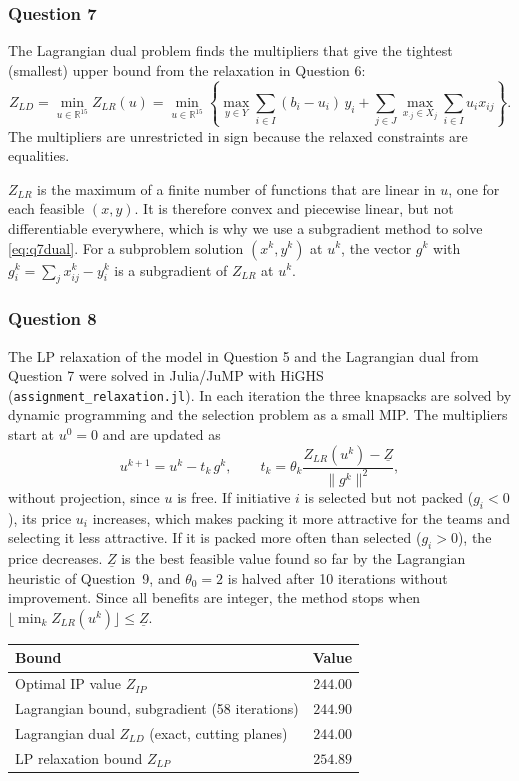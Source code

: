 \subsubsection*{Question 7}

The Lagrangian dual problem finds the multipliers that give the tightest
(smallest) upper bound from the relaxation in Question 6:
\begin{equation}
Z_{LD} = \min_{u \in \mathbb{R}^{15}} Z_{LR}(u)
= \min_{u \in \mathbb{R}^{15}} \left\{
\max_{y \in Y} \sum_{i \in I} (b_i - u_i)\, y_i
+ \sum_{j \in J} \max_{x_{\cdot j} \in X_j} \sum_{i \in I} u_i x_{ij}
\right\}.
\label{eq:q7dual}
\end{equation}
The multipliers are unrestricted in sign because the relaxed constraints are
equalities.

$Z_{LR}$ is the maximum of a finite number of functions that are linear in
$u$, one for each feasible $(x,y)$. It is therefore convex and piecewise
linear, but not differentiable everywhere, which is why we use a subgradient
method to solve \eqref{eq:q7dual}. For a subproblem solution $(x^k,y^k)$ at
$u^k$, the vector $g^k$ with $g^k_i = \sum_j x^k_{ij} - y^k_i$ is a
subgradient of $Z_{LR}$ at $u^k$.


\subsubsection*{Question 8}

The LP relaxation of the model in Question 5 and the Lagrangian dual from
Question 7 were solved in Julia/JuMP with HiGHS (\texttt{assignment\_relaxation.jl}).
In each iteration the three knapsacks are solved by dynamic programming and
the selection problem as a small MIP. The multipliers start at $u^0 = 0$ and
are updated as
\[
u^{k+1} = u^k - t_k\, g^k, \qquad
t_k = \theta_k \frac{Z_{LR}(u^k) - \underline{Z}}{\lVert g^k \rVert^2},
\]
without projection, since $u$ is free. If initiative $i$ is selected but not
packed ($g_i < 0$), its price $u_i$ increases, which makes packing it more
attractive for the teams and selecting it less attractive. If it is packed
more often than selected ($g_i > 0$), the price decreases. $\underline{Z}$ is
the best feasible value found so far by the Lagrangian heuristic of Question~9,
and $\theta_0 = 2$ is halved after 10 iterations without improvement. Since
all benefits are integer, the method stops when
$\lfloor \min_k Z_{LR}(u^k) \rfloor \le \underline{Z}$.

\begin{center}
\begin{tabular}{@{}lr@{}}
\toprule
Bound & Value \\
\midrule
Optimal IP value $Z_{IP}$ & $244.00$ \\
Lagrangian bound, subgradient (58 iterations) & $244.90$ \\
Lagrangian dual $Z_{LD}$ (exact, cutting planes) & $244.00$ \\
LP relaxation bound $Z_{LP}$ & $254.89$ \\
\bottomrule
\end{tabular}
\end{center}

